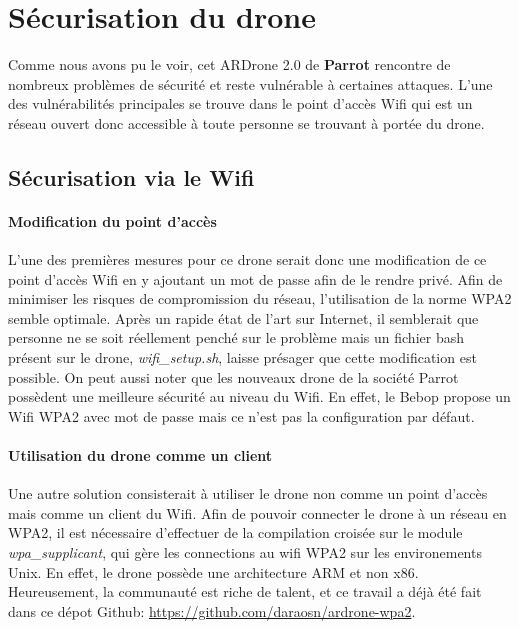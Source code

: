 \section{Sécurisation du drone}
Comme nous avons pu le voir, cet ARDrone 2.0 de \textbf{Parrot} rencontre de nombreux problèmes de sécurité et reste vulnérable à certaines attaques. L'une des vulnérabilités principales se trouve dans le point d'accès Wifi qui est un réseau ouvert donc accessible à toute personne se trouvant à portée du drone.

\subsection{Sécurisation via le Wifi}
\paragraph{Modification du point d'accès}
L'une des premières mesures pour ce drone serait donc une modification de ce point d'accès Wifi en y ajoutant un mot de passe afin de le rendre privé. Afin de minimiser les risques de compromission du réseau, l'utilisation de la norme WPA2 semble optimale. Après un rapide état de l'art sur Internet, il semblerait que personne ne se soit réellement penché sur le problème mais un fichier bash présent sur le drone, \textit{wifi\_setup.sh}, laisse présager que cette modification est possible. On peut aussi noter que les nouveaux drone de la société Parrot possèdent une meilleure sécurité au niveau du Wifi. En effet, le Bebop propose un Wifi WPA2 avec mot de passe mais ce n'est pas la configuration par défaut.

\paragraph{Utilisation du drone comme un client}
Une autre solution consisterait à utiliser le drone non comme un point d'accès mais comme un client du Wifi.
Afin de pouvoir connecter le drone à un réseau en WPA2, il est nécessaire d'effectuer de la compilation croisée sur le module \textit{wpa\_supplicant}, qui gère les connections au wifi WPA2 sur les environements Unix. En effet, le drone possède une architecture ARM et non x86. Heureusement, la communauté est riche de talent, et ce travail a déjà été fait dans ce dépot Github: \url{https://github.com/daraosn/ardrone-wpa2}.\cite{ref7}\\

